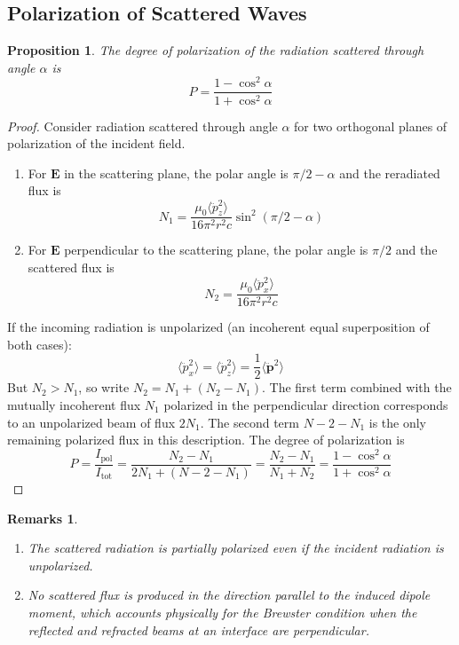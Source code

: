 \documentclass[a4paper]{article}
\newtheorem{remarks}{Remarks}[section]
\theoremstyle{new}
\newtheorem{prop}{Proposition}[section]
\begin{document}
\subsection{Polarization of Scattered Waves}
\begin{prop}
The degree of polarization of the radiation scattered through angle $\alpha$ is
$$P=\frac{1-\cos^2\alpha}{1+\cos^2\alpha}$$
\end{prop}
\begin{proof}
Consider radiation scattered through angle $\alpha$ for two orthogonal planes of polarization of the incident field.
\begin{enumerate}
    \item For $\mathbf{E}$ in the scattering plane, the polar angle is $\pi/2-\alpha$ and the reradiated flux is
    $$N_1=\frac{\mu_0\langle\ddot{p}_z^2\rangle}{16\pi^2r^2c}\sin^2(\pi/2-\alpha)$$
    \item For $\mathbf{E}$ perpendicular to the scattering plane, the polar angle is $\pi/2$ and the scattered flux is
    $$N_2=\frac{\mu_0\langle\ddot{p}_x^2\rangle}{16\pi^2r^2c}$$
\end{enumerate}
If the incoming radiation is unpolarized (an incoherent equal superposition of both cases): 
$$\langle\ddot{p}_x^2\rangle=\langle\ddot{p}_z^2\rangle=\frac{1}{2}\langle\mathbf{\ddot{p}}^2\rangle$$
But $N_2>N_1$, so write $N_2=N_1+(N_2-N_1)$. The first term combined with the mutually incoherent flux $N_1$ polarized in the perpendicular direction corresponds to an unpolarized beam of flux $2N_1$. The second term $N-2-N_1$ is the only remaining polarized flux in this description.
The degree of polarization is
$$P=\frac{I_{\text{pol}}}{I_{\text{tot}}}=\frac{N_2-N_1}{2N_1+(N-2-N_1)}=\frac{N_2-N_1}{N_1+N_2}=\frac{1-\cos^2\alpha}{1+\cos^2\alpha}$$
\end{proof}
\begin{remarks}\leavevmode
\begin{enumerate}
\item The scattered radiation is partially polarized even if the incident radiation is unpolarized.
\item No scattered flux is produced in the direction parallel to the induced dipole moment, which accounts physically for the Brewster condition when the reflected and refracted beams at an interface are perpendicular.
\end{enumerate}
\end{remarks}
\end{document}

